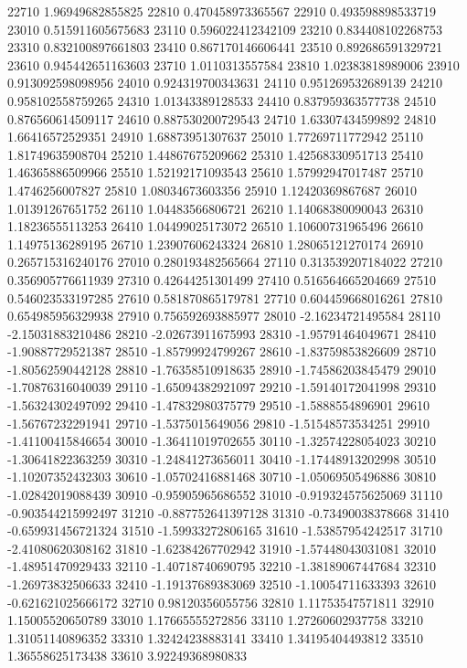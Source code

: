 {22710 1.96949682855825
22810 0.470458973365567
22910 0.493598898533719
23010 0.515911605675683
23110 0.596022412342109
23210 0.834408102268753
23310 0.832100897661803
23410 0.867170146606441
23510 0.892686591329721
23610 0.945442651163603
23710 1.0110313557584
23810 1.02383818989006
23910 0.913092598098956
24010 0.924319700343631
24110 0.951269532689139
24210 0.958102558759265
24310 1.01343389128533
24410 0.837959363577738
24510 0.876560614509117
24610 0.887530200729543
24710 1.63307434599892
24810 1.66416572529351
24910 1.68873951307637
25010 1.77269711772942
25110 1.81749635908704
25210 1.44867675209662
25310 1.42568330951713
25410 1.46365886509966
25510 1.52192171093543
25610 1.57992947017487
25710 1.4746256007827
25810 1.08034673603356
25910 1.12420369867687
26010 1.01391267651752
26110 1.04483566806721
26210 1.14068380090043
26310 1.18236555113253
26410 1.04499025173072
26510 1.10600731965496
26610 1.14975136289195
26710 1.23907606243324
26810 1.28065121270174
26910 0.265715316240176
27010 0.280193482565664
27110 0.313539207184022
27210 0.356905776611939
27310 0.42644251301499
27410 0.516564665204669
27510 0.546023533197285
27610 0.581870865179781
27710 0.604459668016261
27810 0.654985956329938
27910 0.756592693885977
28010 -2.16234721495584
28110 -2.15031883210486
28210 -2.02673911675993
28310 -1.95791464049671
28410 -1.90887729521387
28510 -1.85799924799267
28610 -1.83759853826609
28710 -1.80562590442128
28810 -1.76358510918635
28910 -1.74586203845479
29010 -1.70876316040039
29110 -1.65094382921097
29210 -1.59140172041998
29310 -1.56324302497092
29410 -1.47832980375779
29510 -1.5888554896901
29610 -1.56767232291941
29710 -1.5375015649056
29810 -1.51548573534251
29910 -1.41100415846654
30010 -1.36411019702655
30110 -1.32574228054023
30210 -1.30641822363259
30310 -1.24841273656011
30410 -1.17448913202998
30510 -1.10207352432303
30610 -1.05702416881468
30710 -1.05069505496886
30810 -1.02842019088439
30910 -0.95905965686552
31010 -0.919324575625069
31110 -0.903544215992497
31210 -0.887752641397128
31310 -0.73490038378668
31410 -0.659931456721324
31510 -1.59933272806165
31610 -1.53857954242517
31710 -2.41080620308162
31810 -1.62384267702942
31910 -1.57448043031081
32010 -1.48951470929433
32110 -1.40718740690795
32210 -1.38189067447684
32310 -1.26973832506633
32410 -1.19137689383069
32510 -1.10054711633393
32610 -0.621621025666172
32710 0.98120356055756
32810 1.11753547571811
32910 1.15005520650789
33010 1.17665555272856
33110 1.27260602937758
33210 1.31051140896352
33310 1.32424238883141
33410 1.34195404493812
33510 1.36558625173438
33610 3.92249368980833
}
